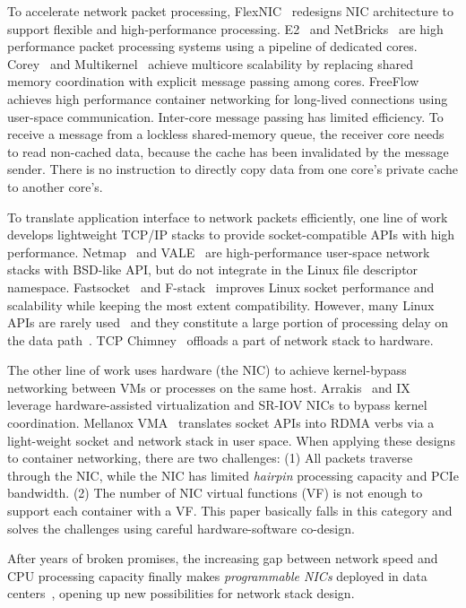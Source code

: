 To accelerate network packet processing,
FlexNIC~\cite{kaufmann2015flexnic} redesigns NIC architecture to support flexible and high-performance processing.
E2~\cite{palkar2015e2} and NetBricks~\cite{panda2016netbricks} are high performance packet processing systems using a pipeline of dedicated cores.
Corey~\cite{boyd2008corey} and Multikernel~\cite{baumann2009multikernel} achieve multicore scalability by replacing shared memory coordination with explicit message passing among cores.
FreeFlow~\cite{freeflow} achieves high performance container networking for long-lived connections using user-space communication.
Inter-core message passing has limited efficiency. To receive a message from a lockless shared-memory queue, the receiver core needs to read non-cached data, because the cache has been invalidated by the message sender. There is no instruction to directly copy data from one core's private cache to another core's.

To translate application interface to network packets efficiently, one line of work develops lightweight TCP/IP stacks to provide socket-compatible APIs with high performance.
Netmap~\cite{rizzo2012netmap} and VALE~\cite{rizzo2012vale} are high-performance user-space network stacks with BSD-like API, but do not integrate in the Linux file descriptor namespace.
Fastsocket~\cite{lin2016scalable} and F-stack~\cite{fstack} improves Linux socket performance and scalability while keeping the most extent compatibility.
However, many Linux APIs are rarely used~\cite{tsai2016study} and they constitute a large portion of processing delay on the data path~\cite{peter2016arrakis}.
TCP Chimney~\cite{networking2004network} offloads a part of network stack to hardware.

The other line of work uses hardware (the NIC) to achieve kernel-bypass networking between VMs or processes on the same host.
Arrakis~\cite{peter2016arrakis} and IX~\cite{belay2014ix} leverage hardware-assisted virtualization and SR-IOV NICs to bypass kernel coordination.
Mellanox VMA~\cite{vma} translates socket APIs into RDMA verbs via a light-weight socket and network stack in user space.
When applying these designs to container networking, there are two challenges: (1) All packets traverse through the NIC, while the NIC has limited \textit{hairpin} processing capacity and PCIe bandwidth. (2) The number of NIC virtual functions (VF) is not enough to support each container with a VF.
This paper basically falls in this category and solves the challenges using careful hardware-software co-design.

After years of broken promises, the increasing gap between network speed and CPU processing capacity finally makes \textit{programmable NICs} deployed in data centers~\cite{smartnic}, opening up new possibilities for network stack design.
